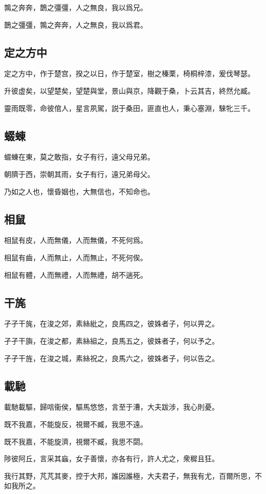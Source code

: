 鶉之奔奔，鵲之彊彊，人之無良，我以爲兄。

鵲之彊彊，鶉之奔奔，人之無良，我以爲君。

\subsection[定之方中]{定之方中}

定之方中，作于楚宫，揆之以日，作于楚室，樹之榛栗，椅桐梓漆，爰伐琴瑟。

升彼虚矣，以望楚矣，望楚與堂，景山與京，降觀于桑，卜云其吉，終然允臧。

靈雨既零，命彼倌人，星言夙駕，説于桑田，匪直也人，秉心塞淵，騋牝三千。

\subsection[蝃蝀]{蝃蝀}

蝃蝀在東，莫之敢指，女子有行，遠父母兄弟。

朝隮于西，崇朝其雨，女子有行，遠兄弟母父。

乃如之人也，懷昏姻也，大無信也，不知命也。

\subsection[相鼠]{相鼠}

相鼠有皮，人而無儀，人而無儀，不死何爲。

相鼠有齒，人而無止，人而無止，不死何俟。

相鼠有體，人而無禮，人而無禮，胡不遄死。

\subsection[干旄]{干旄}

孑孑干旄，在浚之郊，素絲紕之，良馬四之，彼姝者子，何以畀之。

孑孑干旟，在浚之都，素絲組之，良馬五之，彼姝者子，何以予之。

孑孑干旌，在浚之城，素絲祝之，良馬六之，彼姝者子，何以告之。

\subsection[載馳]{載馳}

載馳載驅，歸唁衞侯，驅馬悠悠，言至于漕，大夫跋涉，我心則憂。

既不我嘉，不能旋反，視爾不臧，我思不遠。

既不我嘉，不能旋濟，視爾不臧，我思不閟。

陟彼阿丘，言采其蝱，女子善懷，亦各有行，許人尤之，衆穉且狂。

我行其野，芃芃其麥，控于大邦，誰因誰極，大夫君子，無我有尤，百爾所思，不如我所之。
